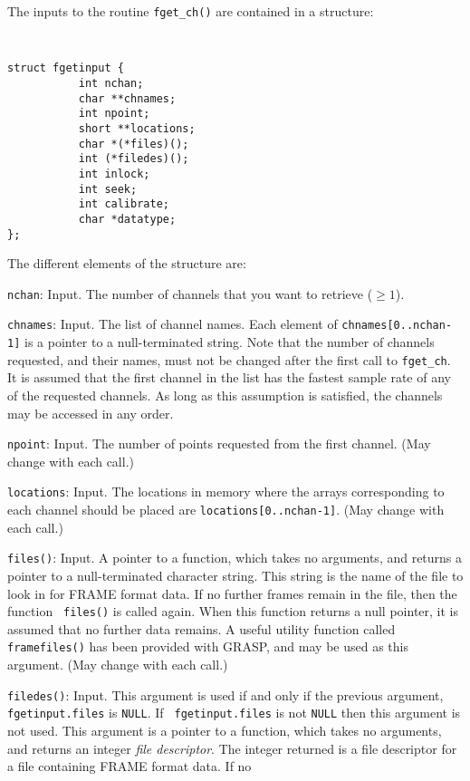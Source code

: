 The inputs to the routine {\tt fget\_ch()} are contained in a structure:
{\tt
\begin{verbatim}
struct fgetinput {
           int nchan;
           char **chnames;
           int npoint;
           short **locations;
           char *(*files)();
           int (*filedes)();
           int inlock;
           int seek;
           int calibrate;
           char *datatype; 
};
\end{verbatim}
}
The different elements of the structure are:
\begin{description}
\item{\tt nchan}: Input.  The number of channels that you want to retrieve ($ \ge 1$).
\item{\tt chnames}: Input.  The list of channel names.  Each element of
{\tt chnames[0..nchan-1]} is
   a pointer to a null-terminated string.  Note that the number of
   channels requested, and their names, must not be changed after the
   first call to {\tt fget\_ch}.  It is assumed that the first channel in
   the list has the fastest sample rate of any of the requested channels.
   As long as this assumption is satisfied, the channels may be accessed
   in any order.
\item{\tt npoint}: Input.  The number of points requested from the first channel.  (May change with each call.)
\item{\tt locations}: Input.  The locations in memory where the arrays corresponding to each channel should be placed
   are {\tt locations[0..nchan-1]}.   (May change with each call.)
\item{\tt files()}: Input.  A pointer to a function, which takes no
   arguments, and returns a pointer to a null-terminated character string.
   This string is the name of the file to look in for FRAME format data.
   If no further frames remain in the file, then the function {\tt
   files()} is called again.  When this function returns a null pointer,
   it is assumed that no further data remains.  A useful utility function
   called {\tt framefiles()} has been provided with GRASP, and may be
   used as this argument.  (May change with each call.)
\item{\tt filedes()}: Input.  This argument is used if and only if the
   previous argument, {\tt fgetinput.files} is {\tt NULL}.  If {\tt
   fgetinput.files} is not {\tt NULL} then this argument is not used.
   This argument is a pointer to a function, which takes no arguments,
   and returns an integer {\it file descriptor}.  The integer returned
   is a file descriptor for a file containing FRAME format data.  If no

\end{description}
